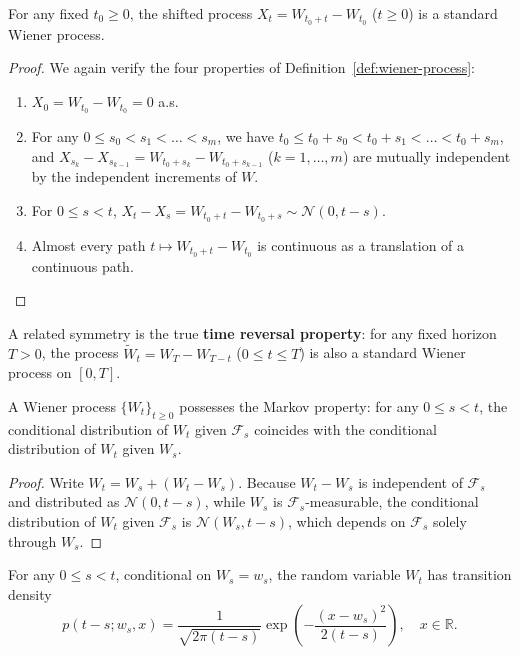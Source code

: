 \begin{theorem}
\label{thm:wiener-time-homogeneity}
For any fixed $t_0 \ge 0$, the shifted process $X_t = W_{t_0 + t} - W_{t_0}$ ($t \ge 0$) is a standard Wiener process.
\end{theorem}
\begin{proof}
We again verify the four properties of Definition~\ref{def:wiener-process}:
\begin{enumerate}
    \item $X_0 = W_{t_0} - W_{t_0} = 0$ a.s.
    \item For any $0 \le s_0 < s_1 < \dots < s_m$, we have $t_0 \le t_0 + s_0 < t_0 + s_1 < \dots < t_0 + s_m$, and $X_{s_k} - X_{s_{k-1}} = W_{t_0 + s_k} - W_{t_0 + s_{k-1}}$ ($k = 1, \dots, m$) are mutually independent by the independent increments of $W$.
    \item For $0 \le s < t$, $X_t - X_s = W_{t_0 + t} - W_{t_0 + s} \sim \mathcal{N}(0, t - s)$.
    \item Almost every path $t \mapsto W_{t_0 + t} - W_{t_0}$ is continuous as a translation of a continuous path. \qedhere
\end{enumerate}
\end{proof}

\begin{remark}
A related symmetry is the true \textbf{time reversal property}: for any fixed horizon $T > 0$, the process $\widetilde{W}_t = W_T - W_{T-t}$ ($0 \le t \le T$) is also a standard Wiener process on $[0, T]$.
\end{remark}

\begin{theorem}
\label{thm:wiener-markov}
A Wiener process $\{W_t\}_{t \ge 0}$ possesses the Markov property: for any $0 \le s < t$, the conditional distribution of $W_t$ given $\mathcal{F}_s$ coincides with the conditional distribution of $W_t$ given $W_s$.
\end{theorem}
\begin{proof}
Write $W_t = W_s + (W_t - W_s)$. Because $W_t - W_s$ is independent of $\mathcal{F}_s$ and distributed as $\mathcal{N}(0, t-s)$, while $W_s$ is $\mathcal{F}_s$-measurable, the conditional distribution of $W_t$ given $\mathcal{F}_s$ is $\mathcal{N}(W_s, t-s)$, which depends on $\mathcal{F}_s$ solely through $W_s$.
\end{proof}

\begin{definition}
\label{def:transition-density}
For any $0 \le s < t$, conditional on $W_s = w_s$, the random variable $W_t$ has transition density
\[
p(t-s; w_s, x) = \frac{1}{\sqrt{2\pi(t-s)}} \exp\left(-\frac{(x - w_s)^2}{2(t-s)}\right), \quad x \in \mathbb{R}.
\]
\end{definition}

